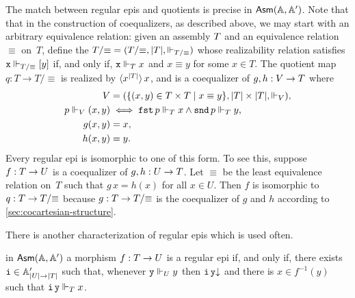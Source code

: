 The match between regular epis and quotients is precise in $\AsmA$.
Note that that in the construction of coequalizers, as described
above, we may start with an arbitrary equivalence relation: given an
assembly $\asm{T}$ and an equivalence relation $\equiv$ on~$T$, define
the  $\asm{T}/{\equiv} = (T/{\equiv}, |T|,
\rz[T/{\equiv}])$ whose realizability relation satisfies $\R{x}
\rz[T/{\equiv}] [y]$ if, and only if, $\R{x} \rz[T] x$ and $x \equiv
y$ for some $x \in T$. The quotient map $q : T \to T/{\equiv}$ is
realized by $\tpcalam{x}{|T|} x$, and is a coequalizer of $g,
h : \asm{V} \to \asm{T}$ where
%
\begin{align*}
  \asm{V} &= (\set{(x,y) \in T \times T \such x \equiv y},
             |T| \times |T|, {\rz[V]}),\\
  p \rz[V] (x,y) &\iff
  \combFst\,p \rz[T] x \land \combSnd\,p \rz[T] y, \\
  g (x, y) &= x,\\
  h (x, y) &= y.
\end{align*}
%
Every regular epi is isomorphic to one of this form. To see this,
suppose $f : \asm{T} \to \asm{U}$ is a coequalizer of $g, h : \asm{U}
\to \asm{T}$. Let $\equiv$ be the least equivalence relation on~$T$
such that $g\,x = h(x)$ for all $x \in U$. Then $f$ is isomorphic to
$q : \asm{T} \to \asm{T}/{\equiv}$ because $g : \asm{T} \to
\asm{T}/{\equiv}$ is the coequalizer of $g$ and $h$ according to
\cref{sec:cocartesian-structure}.

There is another characterization of regular epis which is used often.

\begin{proposition}
  \label{prop:reg-epi-when}%
  in $\AsmA$ a morphism $f : \asm{T} \to \asm{U}$ is a regular epi
  if, and only if, there exists $\R{i} \in \subAtyp{|U| \to |T|}$
  such that, whenever $\R{y} \rz[U] y$ then $\defined{\R{i}\,\R{y}}$
  and there is $x \in f^{-1}(y)$ such that $\R{i}\,\R{y} \rz[T] x$.
\end{proposition}

